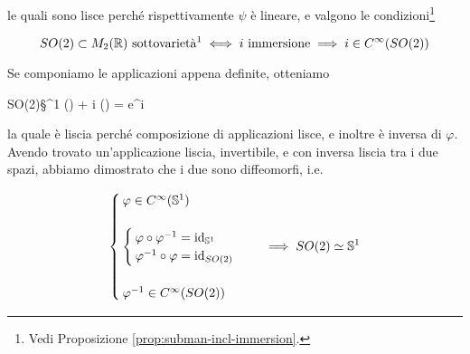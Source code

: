 {le quali sono lisce perché rispettivamente $ \psi $ è lineare, e valgono le condizioni\footnote{%
	Vedi Proposizione \ref{prop:subman-incl-immersion}.%
}

\begin{equation}
	SO(2) \subset M_{2}(\R) \text{ sottovarietà\footnotemark} %
	\iff %
	i \text{ immersione} %
	\implies %
	i \in C^{\infty}(SO(2))
\end{equation}

Se componiamo le applicazioni appena definite, otteniamo

	{SO(2)}{\S^{1}}
	{\bmqty{ \cos(\theta) & \sin(\theta) \\ -\sin(\theta) & \cos(\theta) }}
	{\cos(\theta) + i \sin(\theta) = e^{i \theta}}

la quale è liscia perché composizione di applicazioni lisce, e inoltre è inversa di $ \varphi $. Avendo trovato un'applicazione liscia, invertibile, e con inversa liscia tra i due spazi, abbiamo dimostrato che i due sono diffeomorfi, i.e.

\begin{equation}
	\begin{cases}
		\varphi \in C^{\infty}(\S^{1}) \\ \\
		\begin{cases}
			\varphi \circ \varphi^{-1} = \id_{\S^{1}} \\
			\varphi^{-1} \circ \varphi = \id_{SO(2)}
		\end{cases} \\ \\
		\varphi^{-1} \in C^{\infty}(SO(2))
	\end{cases}
	\implies %
	SO(2) \simeq \S^{1}
\end{equation}
}


